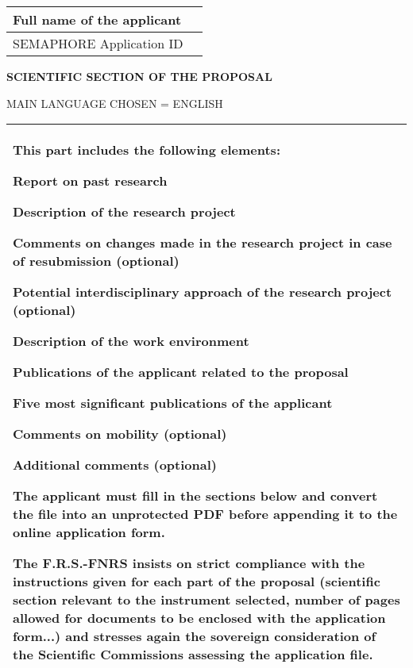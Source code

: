 \documentclass[12pt,a4paper]{article}
\begin{document}
\large
\fontsize{13.3pt}{.77\baselineskip}\selectfont
{\centering\begin{small}
\fontsize{10.7pt}{.85\baselineskip}\selectfont%
{\renewcommand{\arraystretch}{1.2}
\vspace*{-3.5mm}
\begin{tabular}{@{}|p{}|p{}|@{}}
\hline Full name of the applicant &
	\\
\hline SEMAPHORE Application ID &
	\\
\hline
\end{tabular}
}\vspace{.5cm}

\MakeUppercase{\bfseries\Large Scientific section of the proposal}
\par\MakeUppercase{\small Main language chosen = English}
\vspace{4mm}

\hfil\begin{tabular}{|p{10.75cm}|}
\hline
\vspace{1sp}
This part includes the following elements:
\begin{list}{\arabic{enumi}.}{
	\usecounter{enumi}
	\itemsep 0pt \parsep 0pt \parskip 0pt
	\settowidth{\labelwidth}{2.}
	\setlength{\leftmargin}{1.3cm}
}
\item Report on past research
\item Description of the research project
\item Comments on changes made in the research project in case of resubmission (optional)
\item Potential interdisciplinary approach of the research project (optional)
\item Description of the work environment
\item Publications of the applicant related to the proposal
\item Five most significant publications of the applicant
\item Comments on mobility (optional)
\item Additional comments (optional)
\end{list}

\vspace{2mm}
\textbf{\color[RGB]{31,73,125}The applicant must fill in the sections below and convert the file into an unprotected PDF before appending it to the online application form.}

\vspace{4mm}
The F.R.S.-FNRS insists on \textbf{strict compliance with the instructions given for each part of the proposal} (scientific section relevant to the instrument selected, number of pages allowed for documents to be enclosed with the application form...) and stresses again the sovereign consideration of the Scientific Commissions assessing the application file.
\\[1.5mm]\hline
\end{tabular}
\end{small}
}
\end{document}
